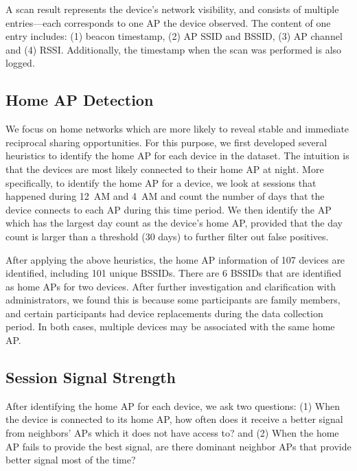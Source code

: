 A \wifi{} scan result represents the device's network visibility, and consists
of multiple entries---each corresponds to one \wifi{} AP the device observed.
The content of one entry includes: (1) beacon timestamp, (2) AP SSID and BSSID,
(3) AP channel and (4) RSSI. Additionally, the timestamp when the scan was
performed is also logged.

\subsection{Home AP Detection}
\label{subsec:homeap}

We focus on home \wifi{} networks which are more likely to reveal stable and
immediate reciprocal sharing opportunities. For this purpose, we first developed
several heuristics to identify the home AP for each device in the dataset. The
intuition is that the devices are most likely connected to their home AP at
night. More specifically, to identify the home AP for a device, we look at
\wifi{} sessions that happened during 12~AM and 4~AM and count the number of
days that the device connects to each AP during this time period. We then
identify the AP which has the largest day count as the device's home AP,
provided that the day count is larger than a threshold (30 days) to further
filter out false positives.

After applying the above heuristics, the home AP information of 107 devices are
identified, including 101 unique BSSIDs. There are 6 BSSIDs that are identified
as home APs for two devices. After further investigation and clarification with
\PhoneLab{} administrators, we found this is because some participants are family
members, and certain participants had device replacements during the data
collection period. In both cases, multiple devices may be associated with the
same home AP.

\subsection{\wifi{} Session Signal Strength}
\label{subsec:better}

After identifying the home AP for each device, we ask two questions: (1) When
the device is connected to its home AP, how often does it receive a better signal
from neighbors' APs which it does not have access to? and (2) When the home AP
fails to provide the best signal, are there dominant neighbor APs
that provide better signal most of the time?

